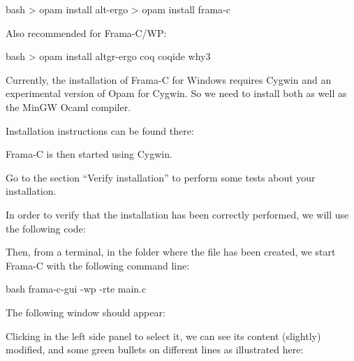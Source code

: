 \begin{CodeBlock}{bash}
> opam install alt-ergo
> opam install frama-c
\end{CodeBlock}



Also recommended for Frama-C/WP:



\begin{CodeBlock}{bash}
> opam install altgr-ergo coq coqide why3
\end{CodeBlock}



Currently, the installation of Frama-C for Windows requires Cygwin and
an experimental version of Opam for Cygwin. So we need to install both
as well as the MinGW Ocaml compiler.



Installation instructions can be found there:






Frama-C is then started using Cygwin.



Go to the section ``Verify installation'' to perform some tests about
your installation.






In order to verify that the installation has been correctly performed,
we will use the following code:






Then, from a terminal, in the folder where the file has been created, we
start Frama-C with the following command line:



\begin{CodeBlock}{bash}
frama-c-gui -wp -rte main.c
\end{CodeBlock}



The following window should appear:





Clicking  in the left side panel to select it, we can see
its content (slightly) modified, and some green bullets on different
lines as illustrated here:



